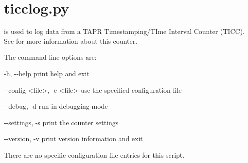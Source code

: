 \section{ticclog.py}
\hypertarget{h:ticclog}{}

 is used to log data from a TAPR Timestamping/TIme Interval Counter (TICC).
See  for more information about this counter.

The command line options are:
\begin{description*}
 \item[-h, -{}-help] print help and exit
 \item[-{}-config \textless file\textgreater, -c \textless file\textgreater] use the specified configuration file
 \item[-{}-debug, -d]           run in debugging mode
 \item[-{}-settings, -s]        print the counter settings
  \item[-{}-version, -v]        print version information and exit
\end{description*}

There are no specific configuration file entries for this script.
